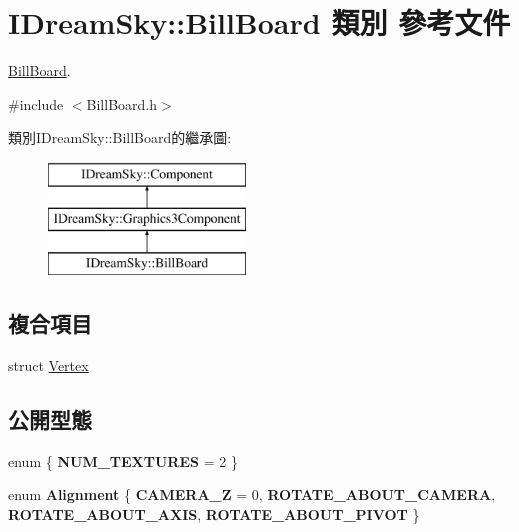 \hypertarget{class_i_dream_sky_1_1_bill_board}{}\section{I\+Dream\+Sky\+:\+:Bill\+Board 類別 參考文件}
\label{class_i_dream_sky_1_1_bill_board}


\hyperlink{class_i_dream_sky_1_1_bill_board}{Bill\+Board}.  




{\ttfamily \#include $<$Bill\+Board.\+h$>$}

類別\+I\+Dream\+Sky\+:\+:Bill\+Board的繼承圖\+:\begin{figure}[H]
\begin{center}
\leavevmode
\includegraphics[height=3.000000cm]{class_i_dream_sky_1_1_bill_board}
\end{center}
\end{figure}
\subsection*{複合項目}
\begin{DoxyCompactItemize}
\item 
struct \hyperlink{struct_i_dream_sky_1_1_bill_board_1_1_vertex}{Vertex}
\end{DoxyCompactItemize}
\subsection*{公開型態}
\begin{DoxyCompactItemize}
\item 
enum \{ {\bfseries N\+U\+M\+\_\+\+T\+E\+X\+T\+U\+R\+ES} = 2
 \}\hypertarget{class_i_dream_sky_1_1_bill_board_a8ea50514cbc92ce304d0bd5d07396b64}{}\label{class_i_dream_sky_1_1_bill_board_a8ea50514cbc92ce304d0bd5d07396b64}

\item 
enum {\bfseries Alignment} \{ {\bfseries C\+A\+M\+E\+R\+A\+\_\+Z} = 0, 
{\bfseries R\+O\+T\+A\+T\+E\+\_\+\+A\+B\+O\+U\+T\+\_\+\+C\+A\+M\+E\+RA}, 
{\bfseries R\+O\+T\+A\+T\+E\+\_\+\+A\+B\+O\+U\+T\+\_\+\+A\+X\+IS}, 
{\bfseries R\+O\+T\+A\+T\+E\+\_\+\+A\+B\+O\+U\+T\+\_\+\+P\+I\+V\+OT}
 \}\hypertarget{class_i_dream_sky_1_1_bill_board_a9e2ecfd284a652b20a4f057b77e86707}{}\label{class_i_dream_sky_1_1_bill_board_a9e2ecfd284a652b20a4f057b77e86707}

\end{DoxyCompactItemize}

